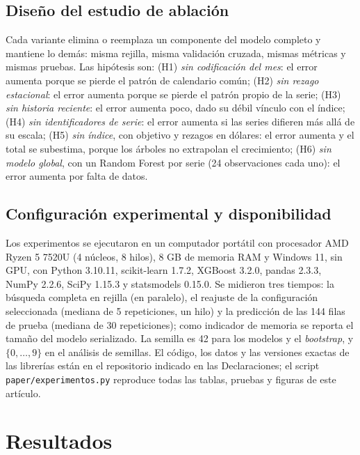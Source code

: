 \documentclass[pdflatex,sn-mathphys-num]{sn-jnl}
\begin{document}
\subsection{Diseño del estudio de ablación}\label{subsec:ablacion}

Cada variante elimina o reemplaza un componente del modelo completo y mantiene lo demás: misma rejilla, misma validación cruzada, mismas métricas y mismas pruebas. Las hipótesis son: (H1) \emph{sin codificación del mes}: el error aumenta porque se pierde el patrón de calendario común; (H2) \emph{sin rezago estacional}: el error aumenta porque se pierde el patrón propio de la serie; (H3) \emph{sin historia reciente}: el error aumenta poco, dado su débil vínculo con el índice; (H4) \emph{sin identificadores de serie}: el error aumenta si las series difieren más allá de su escala; (H5) \emph{sin índice}, con objetivo y rezagos en dólares: el error aumenta y el total se subestima, porque los árboles no extrapolan el crecimiento; (H6) \emph{sin modelo global}, con un Random Forest por serie (24 observaciones cada uno): el error aumenta por falta de datos.

\subsection{Configuración experimental y disponibilidad}\label{subsec:config}

Los experimentos se ejecutaron en un computador portátil con procesador AMD Ryzen 5 7520U (4 núcleos, 8 hilos), 8 GB de memoria RAM y Windows 11, sin GPU, con Python 3.10.11, scikit-learn 1.7.2, XGBoost 3.2.0, pandas 2.3.3, NumPy 2.2.6, SciPy 1.15.3 y statsmodels 0.15.0. Se midieron tres tiempos: la búsqueda completa en rejilla (en paralelo), el reajuste de la configuración seleccionada (mediana de 5 repeticiones, un hilo) y la predicción de las 144 filas de prueba (mediana de 30 repeticiones); como indicador de memoria se reporta el tamaño del modelo serializado. La semilla es 42 para los modelos y el \emph{bootstrap}, y $\{0,\dots,9\}$ en el análisis de semillas. El código, los datos y las versiones exactas de las librerías están en el repositorio indicado en las Declaraciones; el script \texttt{paper/experimentos.py} reproduce todas las tablas, pruebas y figuras de este artículo.

\section{Resultados}\label{sec:resultados}
\end{document}
